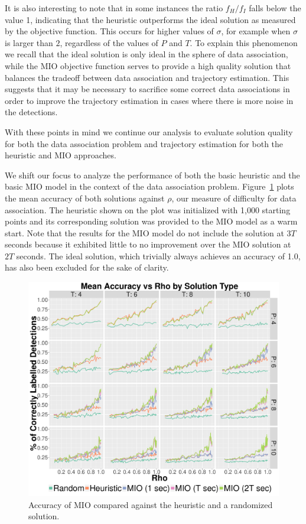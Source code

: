 It is also interesting to note that in some instances the ratio $f_{H}/f_{I}$ falls below the value 1, indicating that the heuristic outperforms the ideal solution as measured by the objective function. This occurs for higher values of $\sigma$, for example when $\sigma$ is larger than $2$, regardless of the values of $P$ and $T$. To explain this phenomenon we recall that the ideal solution is only ideal in the sphere of data association, while the MIO objective function serves to provide a high quality solution that balances the tradeoff between data association and trajectory estimation. This suggests that it may be necessary to sacrifice some correct data associations in order to improve the trajectory estimation in cases where there is more noise in the detections. 

With these points in mind we continue our analysis to evaluate solution quality for both the data association problem and trajectory estimation for both the heuristic and MIO approaches.

We shift our focus to analyze the performance of both the basic heuristic and the basic MIO model in the context of the data association problem. Figure~\ref{fig:Basic_Accuracy_Summary} plots the mean accuracy of both solutions against $\rho$, our measure of difficulty for data association. The heuristic shown on the plot was initialized with 1,000 starting points and its corresponding solution was provided to the MIO model as a warm start. Note that the results for the MIO model do not include the solution at $3T$ seconds because it exhibited little to no improvement over the MIO solution at $2T$ seconds. The ideal solution, which trivially always achieves an accuracy of 1.0, has also been excluded for the sake of clarity.
\begin{figure}[ht]
  \centering  
  \includegraphics[width=\columnwidth]{../Figures/Basic_Accuracy_Summary}
  \caption{Accuracy of MIO compared against the heuristic and a randomized solution.}
  \label{fig:Basic_Accuracy_Summary}
\end{figure}

